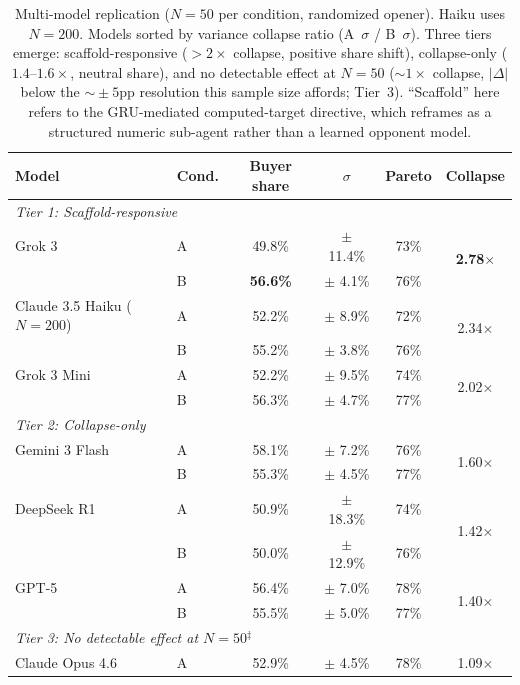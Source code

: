 \documentclass[11pt,a4paper]{article}
\begin{document}
\begin{table}[t]
\centering
\caption{Multi-model replication ($N = 50$ per condition, randomized opener). Haiku uses $N = 200$. Models sorted by variance collapse ratio (A~$\sigma$ / B~$\sigma$). Three tiers emerge: scaffold-responsive ($>2\times$ collapse, positive share shift), collapse-only ($1.4$--$1.6\times$, neutral share), and no detectable effect at $N\!=\!50$ (${\sim}1\times$ collapse, $|\Delta|$ below the $\sim\!\pm 5$pp resolution this sample size affords;  Tier~3). ``Scaffold'' here refers to the GRU-mediated computed-target directive, which  reframes as a structured numeric sub-agent rather than a learned opponent model.}
\label{tab:multimodel}
\small
\begin{tabular}{llcccc}
\toprule
Model & Cond. & Buyer share & $\sigma$ & Pareto & Collapse \\
\midrule
\multicolumn{6}{l}{\emph{Tier 1: Scaffold-responsive}} \\
Grok 3 & A & 49.8\% & $\pm$ 11.4\% & 73\% & \multirow{2}{*}{\textbf{2.78$\times$}} \\
 & B & \textbf{56.6\%} & $\pm$ 4.1\% & 76\% & \\[2pt]
Claude 3.5 Haiku ($N\!=\!200$) & A & 52.2\% & $\pm$ 8.9\% & 72\% & \multirow{2}{*}{2.34$\times$} \\
 & B & 55.2\% & $\pm$ 3.8\% & 76\% & \\[2pt]
Grok 3 Mini & A & 52.2\% & $\pm$ 9.5\% & 74\% & \multirow{2}{*}{2.02$\times$} \\
 & B & 56.3\% & $\pm$ 4.7\% & 77\% & \\[2pt]
\midrule
\multicolumn{6}{l}{\emph{Tier 2: Collapse-only}} \\
Gemini 3 Flash & A & 58.1\% & $\pm$ 7.2\% & 76\% & \multirow{2}{*}{1.60$\times$} \\
 & B & 55.3\% & $\pm$ 4.5\% & 77\% & \\[2pt]
DeepSeek R1 & A & 50.9\% & $\pm$ 18.3\% & 74\% & \multirow{2}{*}{1.42$\times$} \\
 & B & 50.0\% & $\pm$ 12.9\% & 76\% & \\[2pt]
GPT-5 & A & 56.4\% & $\pm$ 7.0\% & 78\% & \multirow{2}{*}{1.40$\times$} \\
 & B & 55.5\% & $\pm$ 5.0\% & 77\% & \\[2pt]
\midrule
\multicolumn{6}{l}{\emph{Tier 3: No detectable effect at $N\!=\!50$}$^{\ddagger}$} \\
Claude Opus 4.6 & A & 52.9\% & $\pm$ 4.5\% & 78\% & \multirow{2}{*}{1.09$\times$} \\

\end{tabular}
\end{table}
\end{document}
